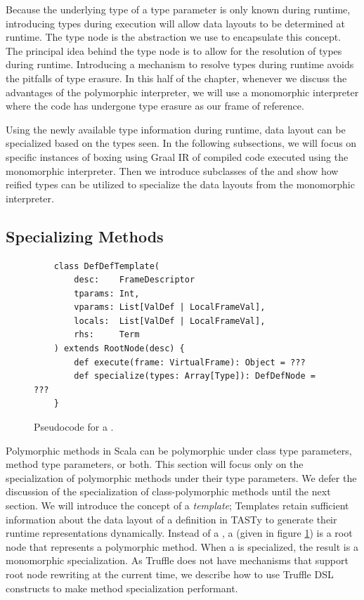 Because the underlying type of a type parameter is only known during runtime, introducing types during execution will allow data layouts to be determined at runtime.
The type node is the abstraction we use to encapsulate this concept.
The principal idea behind the type node is to allow for the resolution of types during runtime.
Introducing a mechanism to resolve types during runtime avoids the pitfalls of type erasure.
In this half of the chapter, whenever we discuss the advantages of the polymorphic interpreter, we will use a monomorphic interpreter where the code has undergone type erasure as our frame of reference.

Using the newly available type information during runtime, data layout can be specialized based on the types seen.
In the following subsections, we will focus on specific instances of boxing using Graal IR of compiled code executed using the monomorphic interpreter.
Then we introduce subclasses of the  and show how reified types can be utilized to specialize the data layouts from the monomorphic interpreter.

\subsection{Specializing Methods}

\begin{figure}[!htb]
	\begin{verbatim}
	class DefDefTemplate(
		desc:    FrameDescriptor
		tparams: Int, 
		vparams: List[ValDef | LocalFrameVal], 
		locals:  List[ValDef | LocalFrameVal],
		rhs:     Term
	) extends RootNode(desc) {
		def execute(frame: VirtualFrame): Object = ???
		def specialize(types: Array[Type]): DefDefNode = ???
	}
	\end{verbatim}
	\caption{Pseudocode for a .}
	\label{impl:defdeftemplate}
\end{figure}

Polymorphic methods in Scala can be polymorphic under class type parameters, method type parameters, or both. 
This section will focus only on the specialization of polymorphic methods under their type parameters.
We defer the discussion of the specialization of class-polymorphic methods until the next section.
We will introduce the concept of a \textit{template}; Templates retain sufficient information about the data layout of a definition in TASTy to generate their runtime representations dynamically.
Instead of a , a  (given in figure \ref{impl:defdeftemplate}) is a root node that represents a polymorphic method. 
When a  is specialized, the result is a monomorphic  specialization.
As Truffle does not have mechanisms that support root node rewriting at the current time, we describe how to use Truffle DSL constructs to make method specialization performant.

